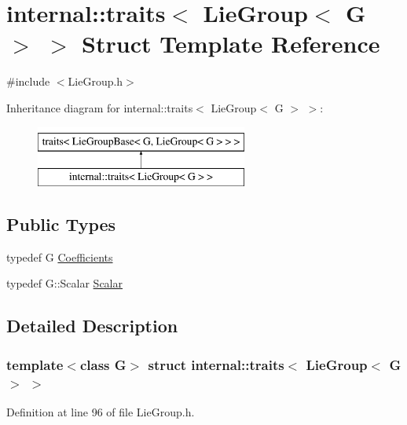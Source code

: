 \hypertarget{structinternal_1_1traits_3_01_lie_group_3_01_g_01_4_01_4}{}\section{internal\+:\+:traits$<$ Lie\+Group$<$ G $>$ $>$ Struct Template Reference}
\label{structinternal_1_1traits_3_01_lie_group_3_01_g_01_4_01_4}


{\ttfamily \#include $<$Lie\+Group.\+h$>$}

Inheritance diagram for internal\+:\+:traits$<$ Lie\+Group$<$ G $>$ $>$\+:\begin{figure}[H]
\begin{center}
\leavevmode
\includegraphics[height=2.000000cm]{structinternal_1_1traits_3_01_lie_group_3_01_g_01_4_01_4}
\end{center}
\end{figure}
\subsection*{Public Types}
\begin{DoxyCompactItemize}
\item 
typedef G \hyperlink{structinternal_1_1traits_3_01_lie_group_3_01_g_01_4_01_4_adfb0de0a4ac03ebf58b0e6d9372e831d}{Coefficients}
\item 
typedef G\+::\+Scalar \hyperlink{structinternal_1_1traits_3_01_lie_group_3_01_g_01_4_01_4_ab4c105288bd0027999a766a8ca7ac9c5}{Scalar}
\end{DoxyCompactItemize}


\subsection{Detailed Description}
\subsubsection*{template$<$class G$>$\newline
struct internal\+::traits$<$ Lie\+Group$<$ G $>$ $>$}



Definition at line 96 of file Lie\+Group.\+h.



